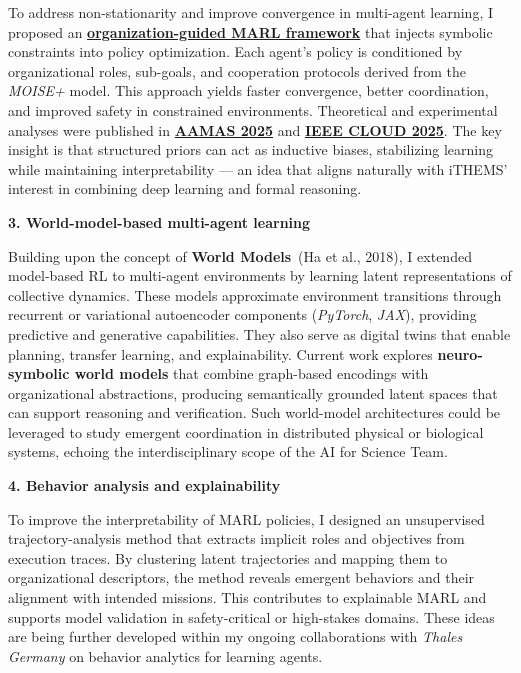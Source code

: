 \documentclass[11pt,a4paper,sans]{moderncv}
\begin{document}
\noindent
To address non-stationarity and improve convergence in multi-agent learning, I proposed an \href{https://github.com/julien6/MOISE-MARL}{\textbf{organization-guided MARL framework}} that injects symbolic constraints into policy optimization. Each agent’s policy is conditioned by organizational roles, sub-goals, and cooperation protocols derived from the \textit{MOISE+} model. This approach yields faster convergence, better coordination, and improved safety in constrained environments. Theoretical and experimental analyses were published in \href{https://arxiv.org/abs/2503.23615}{\textbf{AAMAS 2025}} and \href{https://arxiv.org/abs/2505.21559}{\textbf{IEEE CLOUD 2025}}. The key insight is that structured priors can act as inductive biases, stabilizing learning while maintaining interpretability — an idea that aligns naturally with iTHEMS’ interest in combining deep learning and formal reasoning.

\bigskip
\textbf{3. World-model-based multi-agent learning}

\noindent
Building upon the concept of \textbf{World Models}~(Ha et al., 2018), I extended model-based RL to multi-agent environments by learning latent representations of collective dynamics. These models approximate environment transitions through recurrent or variational autoencoder components (\textit{PyTorch}, \textit{JAX}), providing predictive and generative capabilities. They also serve as digital twins that enable planning, transfer learning, and explainability. Current work explores \textbf{neuro-symbolic world models} that combine graph-based encodings with organizational abstractions, producing semantically grounded latent spaces that can support reasoning and verification. Such world-model architectures could be leveraged to study emergent coordination in distributed physical or biological systems, echoing the interdisciplinary scope of the AI for Science Team.

\bigskip
\textbf{4. Behavior analysis and explainability}

\noindent
To improve the interpretability of MARL policies, I designed an unsupervised trajectory-analysis method that extracts implicit roles and objectives from execution traces. By clustering latent trajectories and mapping them to organizational descriptors, the method reveals emergent behaviors and their alignment with intended missions. This contributes to explainable MARL and supports model validation in safety-critical or high-stakes domains. These ideas are being further developed within my ongoing collaborations with \textit{Thales Germany} on behavior analytics for learning agents.
\end{document}
